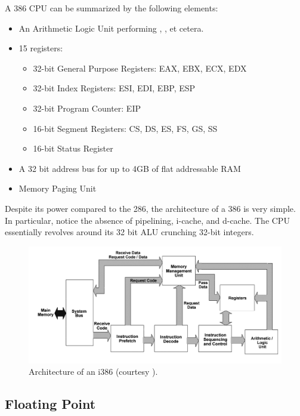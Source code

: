 \documentclass[book.tex]{subfiles}
\begin{document}
A 386 CPU can be summarized by the following elements:
\begin{itemize}
\item An Arithmetic Logic Unit performing , ,  et cetera.
\item 15 registers:
\begin{itemize}
  \item 32-bit General Purpose Registers: EAX, EBX, ECX, EDX
  \item 32-bit Index Registers: ESI, EDI, EBP, ESP
  \item 32-bit Program Counter: EIP
  \item 16-bit Segment Registers: CS, DS, ES, FS, GS, SS
  \item 16-bit Status Register
\end{itemize}
\item A 32 bit address bus for up to 4GB of flat addressable RAM
\item Memory Paging Unit
\end{itemize}
 
\par
Despite its power compared to the 286, the architecture of a 386 is very simple. In particular, notice the absence of pipelining, i-cache, and d-cache. The CPU essentially revolves around its 32 bit ALU crunching 32-bit integers.

\begin{figure}[H]
\centering
  
      \includegraphics[width=\textwidth]{imgs/drawings/80386DX_arch.png}
\caption{Architecture of an i386 (courtesy ).}
\end{figure}








  \subsection{Floating Point}
  
\end{document}
